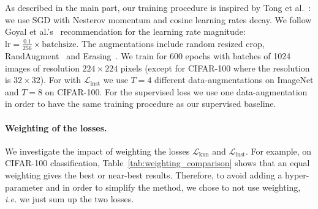 \label{app:train_settings}
As described in the main part, 
our training procedure is inspired by Tong et al.~\cite{Tong2018BagofTricks}:
 we use SGD with Nesterov momentum and cosine learning rates decay.
 We follow  Goyal et al.'s~\cite{Goyal2017AccurateLM} recommendation for the  learning rate magnitude: $\mathrm{lr}=\frac{0.1}{256} \times \mathrm{batch size}$.
 The augmentations include random resized crop, RandAugment~\cite{Cubuk2019RandAugmentPA} and Erasing~\cite{Zhong2020RandomED}.
 We train for 600 epochs with batches of 1024 images of resolution $224\times 224$ pixels  (except for CIFAR-100 where the resolution is $32\times 32$).
 For \ours with $\mathcal{L}_\mathrm{inst}$ we use $T=4$ different data-augmentations on ImageNet and $T=8$ on CIFAR-100.
 For the supervised loss we use one data-augmentation in order to have the same training procedure as our supervised baseline.

\paragraph{Weighting of the losses.}
\label{sec:lossweight}

We investigate the impact of weighting the losses  $\mathcal{L}_\mathrm{knn}$ and $\mathcal{L}_\mathrm{inst}$. 
For example, on CIFAR-100 classification, Table~\ref{tab:weighting_comparison} shows that an equal weighting gives the best or near-best results. 
Therefore, to avoid adding a hyper-parameter and in order to simplify the method, we chose to not use weighting, \emph{i.e.} we just sum up the two losses.

   \begin{table}[t]
    \caption{Category-level (mAP, \%) and one-the-fly kNN classification (top-1, \%)  performance in a coarse-to-fine setting on CIFAR-100 with different loss weighting. Our total loss is $\mathcal{L}_\mathrm{tot}(x)= \mathcal{L}_\mathrm{knn}(g_{\theta}(x),y) +  \lambda \mathcal{L}_\mathrm{inst}(x)$ with $\lambda$ being a real-valued coefficient.
    \label{tab:weighting_comparison}}
    \centering
    \end{table} 
